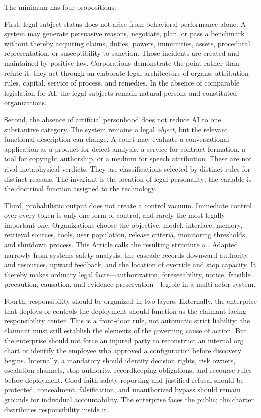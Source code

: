 The minimum has four propositions.

First, legal subject status does not arise from behavioral performance alone. A system may generate persuasive reasons, negotiate, plan, or pass a benchmark without thereby acquiring claims, duties, powers, immunities, assets, procedural representation, or susceptibility to sanction. Those incidents are created and maintained by positive law. Corporations demonstrate the point rather than refute it: they act through an elaborate legal architecture of organs, attribution rules, capital, service of process, and remedies. In the absence of comparable legislation for AI, the legal subjects remain natural persons and constituted organizations.

Second, the absence of artificial personhood does not reduce AI to one substantive category. The system remains a legal \emph{object}, but the relevant functional description can change. A court may evaluate a conversational application as a product for defect analysis, a service for contract formation, a tool for copyright authorship, or a medium for speech attribution. These are not rival metaphysical verdicts. They are classifications selected by distinct rules for distinct reasons. The invariant is the location of legal personality; the variable is the doctrinal function assigned to the technology.

Third, probabilistic output does not create a control vacuum. Immediate control over every token is only one form of control, and rarely the most legally important one. Organizations choose the objective, model, interface, memory, retrieval sources, tools, user population, release criteria, monitoring thresholds, and shutdown process. This Article calls the resulting structure a \Cascade. Adapted narrowly from systems-safety analysis, the cascade records downward authority and resources, upward feedback, and the location of override and stop capacity. It thereby makes ordinary legal facts---authorization, foreseeability, notice, feasible precaution, causation, and evidence preservation---legible in a multi-actor system.

Fourth, responsibility should be organized in two layers. Externally, the enterprise that deploys or controls the deployment should function as the claimant-facing responsibility center. This is a front-door rule, not automatic strict liability: the claimant must still establish the elements of the governing cause of action. But the enterprise should not force an injured party to reconstruct an internal org chart or identify the employee who approved a configuration before discovery begins. Internally, a mandatory \Charter{} should identify decision rights, risk owners, escalation channels, stop authority, recordkeeping obligations, and recourse rules before deployment. Good-faith safety reporting and justified refusal should be protected; concealment, falsification, and unauthorized bypass should remain grounds for individual accountability. The enterprise faces the public; the charter distributes responsibility inside it.

